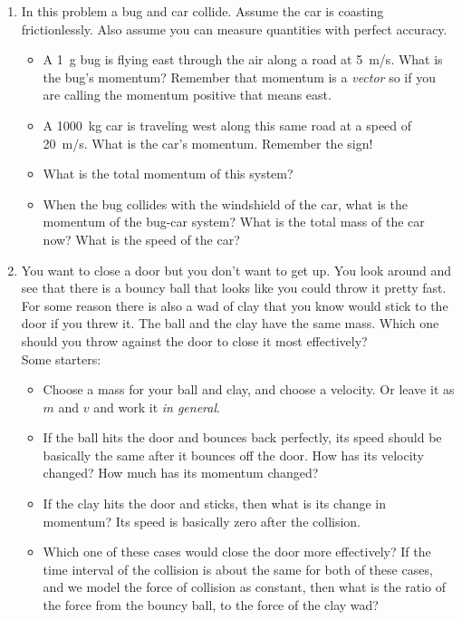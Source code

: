 \begin{enumerate}
\setlength\itemsep{1 in}

\item In this problem a bug and car collide. Assume the car is coasting frictionlessly. Also assume you can measure quantities with perfect accuracy. 
\begin{itemize}
	\item A \SI{1}{\gram} bug is flying east through the air along a road at \SI{5}{m/s}. What is the bug's momentum? Remember that momentum is a \emph{vector} so if you are calling the momentum positive that means east.\bigskip
	\item A \SI{1000}{kg} car is traveling west along this same road at a speed of \SI{20}{m/s}. What is the car's momentum. Remember the sign!\bigskip
	\item What is the total momentum of this system?\bigskip
	\item When the bug collides with the windshield of the car, what is the momentum of the bug-car system? What is the total mass of the car now? What is the speed of the car?
\end{itemize}



\item You want to close a door but you don't want to get up. You look around and see that there is a bouncy ball that looks like you could throw it pretty fast. For some reason there is also a wad of clay that you know would stick to the door if you threw it. The ball and the clay have the same mass. Which one should you throw against the door to close it most effectively?\\
Some starters:
\begin{itemize}
	\item Choose a mass for your ball and clay, and choose a velocity. Or leave it as $m$ and $v$ and work it \emph{in general}.
	\item If the ball hits the door and bounces back perfectly, its speed should be basically the same after it bounces off the door. How has its velocity changed? How much has its momentum changed?\bigskip
	\item If the clay hits the door and sticks, then what is its change in momentum? Its speed is basically zero after the collision.\bigskip
	\item Which one of these cases would close the door more effectively? If the time interval of the collision is about the same for both of these cases, and we model the force of collision as constant, then what is the ratio of the force from the bouncy ball, to the force of the clay wad?
\end{itemize}



\end{enumerate}
